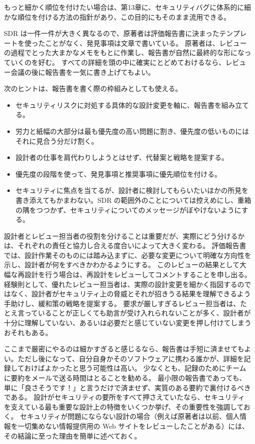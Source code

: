 \documentclass[uplatex]{jsarticle}
\begin{document}
もっと細かく順位を付けたい場合は、第13章に、セキュリティバグに体系的に細かな順位を付ける方法の指針があり、この目的にもそのまま流用できる。

SDR は一件一件が大きく異なるので、原著者は評価報告書に決まったテンプレートを使ったことがなく、発見事項は文章で書いている。
原著者は、レビューの過程でとった大まかなメモをもとに作業し、報告書が自然に最終的な形になっていくのを好む。
すべての詳細を頭の中に確実にとどめておけるなら、レビュー会議の後に報告書を一気に書き上げてもよい。

次のヒントは、報告書を書く際の枠組みとしても使える。
\begin{itemize}
\item セキュリティリスクに対処する具体的な設計変更を軸に、報告書を組み立てる。
\item 労力と紙幅の大部分は最も優先度の高い問題に割き、優先度の低いものにはそれに見合う分だけ割く。
\item 設計者の仕事を肩代わりしようとはせず、代替案と戦略を提案する。
\item 優先度の段階を使って、発見事項と推奨事項に優先順位を付ける。
\item セキュリティに焦点を当てるが、設計者に検討してもらいたいほかの所見を書き添えてもかまわない。SDR の範囲外のことについては控えめにし、重箱の隅をつつかず、セキュリティについてのメッセージがぼやけないようにする。
\end{itemize}

設計者とレビュー担当者の役割を分けることは重要だが、実際にどう分けるかは、それぞれの責任と協力し合える度合いによって大きく変わる。
評価報告書では、設計作業そのものには踏み込まずに、必要な変更について明確な方向性を示し、設計者が何をすべきかわかるようにする。
このレビューの結果として大幅な再設計を行う場合は、再設計をレビューしてコメントすることを申し出る。
経験則として、優れたレビュー担当者は、実際の設計変更を細かく指図するのではなく、設計者がセキュリティ上の脅威とそれが招きうる結果を理解できるよう手助けし、緩和策の戦略を提案する。
要求が厳しすぎるレビュー担当者は、たとえ言っていることが正しくても助言が受け入れられないことが多く、設計者が十分に理解していない、あるいは必要だと感じていない変更を押し付けてしまうおそれもある。

ここまで厳密にやるのは細かすぎると感じるなら、報告書は手短に済ませてもよい。ただし後になって、自分自身かそのソフトウェアに携わる誰かが、詳細を記録しておけばよかったと思う可能性は高い。
少なくとも、記録のためにチームに要約をメールで送る時間はとることを勧める。
最小限の報告書であっても、単に「良さそうです！」と言うだけで済ませず、実質のある要約で裏付けるべきである。
設計がセキュリティの要所をすべて押さえていたなら、セキュリティを支えている最も重要な設計上の特徴をいくつか挙げ、その重要性を強調しておく。
セキュリティが問題にならない設計の場合（例えば原著者は以前、個人情報を一切集めない情報提供用の Web サイトをレビューしたことがある）には、その結論に至った理由を簡単に述べておく。
\end{document}
